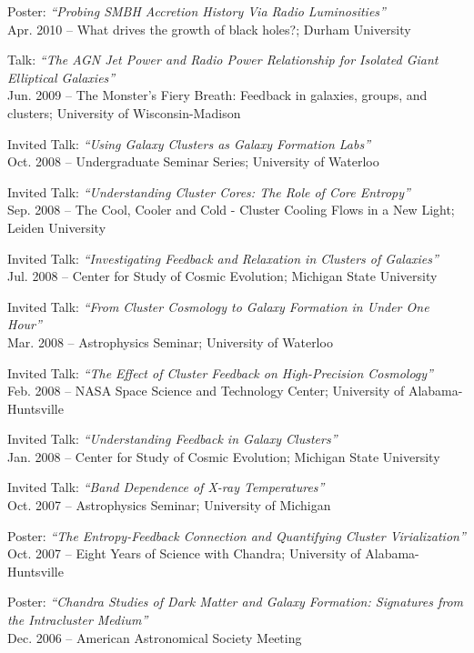 \documentclass[11pt]{cv}
\begin{document}
\begin{llist}
{\sc Poster: {\textit{``Probing SMBH Accretion History Via Radio Luminosities''}}}\\
Apr. 2010 -- What drives the growth of black holes?; Durham University

{\sc Talk: {\textit{``The AGN Jet Power and Radio Power Relationship for Isolated Giant Elliptical Galaxies''}}}\\
Jun. 2009 -- The Monster's Fiery Breath: Feedback in galaxies, groups, and clusters; University of Wisconsin-Madison

{\sc Invited Talk: {\textit{``Using Galaxy Clusters as Galaxy Formation Labs''}}}\\
Oct. 2008 -- Undergraduate Seminar Series; University of Waterloo

{\sc Invited Talk: {\textit{``Understanding Cluster Cores: The Role of Core Entropy''}}}\\
Sep. 2008 -- The Cool, Cooler and Cold - Cluster Cooling Flows in a New Light; Leiden University

{\sc Invited Talk: {\textit{``Investigating Feedback and Relaxation in Clusters of Galaxies''}}}\\
Jul. 2008 -- Center for Study of Cosmic Evolution; Michigan State University

{\sc Invited Talk: {\textit{``From Cluster Cosmology to Galaxy Formation in Under One Hour''}}}\\
Mar. 2008 -- Astrophysics Seminar; University of Waterloo

{\sc Invited Talk: {\textit{``The Effect of Cluster Feedback on High-Precision Cosmology''}}}\\
Feb. 2008 -- NASA Space Science and Technology Center; University of Alabama-Huntsville

{\sc Invited Talk: {\textit{``Understanding Feedback in Galaxy Clusters''}}}\\
Jan. 2008 -- Center for Study of Cosmic Evolution; Michigan State University

{\sc Invited Talk: {\textit{``Band Dependence of X-ray Temperatures''}}}\\
Oct. 2007 -- Astrophysics Seminar; University of Michigan

{\sc Poster: {\textit{``The Entropy-Feedback Connection and Quantifying Cluster Virialization''}}}\\
Oct. 2007 -- Eight Years of Science with Chandra; University of Alabama-Huntsville

{\sc Poster: {\textit{``Chandra Studies of Dark Matter and Galaxy Formation: Signatures from the Intracluster Medium''}}}\\
Dec. 2006 -- American Astronomical Society Meeting


\end{llist}
\end{document}
